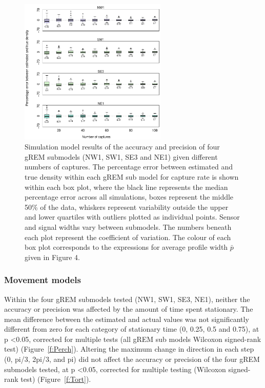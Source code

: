\documentclass[a4paper,10pt,reqno,oneside]{amsart}
\begin{document}
\begin{figure}[t]
       \centering
	\includegraphics[width=7cm]{imgs/ResultsNoCaptures.pdf}
        \caption{Simulation model results of the accuracy and precision of four gREM submodels (NW1, SW1, SE3 and NE1) given different numbers of captures. The percentage error between estimated and true density within each gREM sub model for capture rate is shown within each box plot, where the black line represents the median percentage error across all simulations, boxes represent the middle 50\% of the data, whiskers represent variability outside the upper and lower quartiles with outliers plotted as individual points. Sensor and signal widths vary between submodels. The numbers beneath each plot represent the coefficient of variation. The colour of each box plot corresponds to the expressions for average profile width $\bar{p}$ given in Figure 4. }            
	\label{f:Captures}
\end{figure}


\subsubsection*{Movement models}

Within the four gREM submodels tested (NW1, SW1, SE3, NE1), neither the accuracy or precision was affected by the amount of time spent stationary. The mean difference between the estimated and actual values was not significantly different from zero for each category of stationary time (0, 0.25, 0.5 and 0.75), at p \textless 0.05, corrected for multiple tests (all gREM sub models Wilcoxon signed-rank test) (Figure~\ref{f:Perch}). Altering the maximum change in direction in each step (0, pi/3, 2pi/3, and pi) did not affect the accuracy or precision of the four gREM submodels tested, at p \textless 0.05, corrected for multiple testing (Wilcoxon signed-rank test) (Figure~\ref{f:Tort}). 
\end{document}

